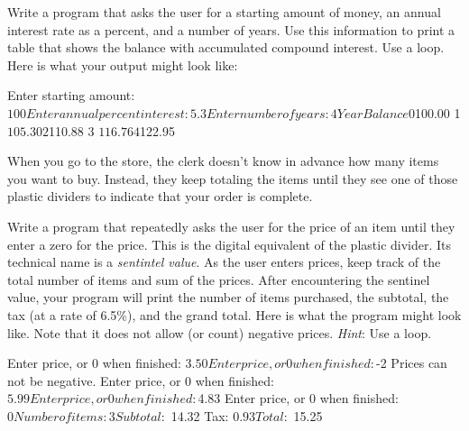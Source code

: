 \begin{exercise}
Write a program that asks the user for a starting amount of money, an annual interest rate as a percent, and a number of years. Use this information to print a table that shows the balance with accumulated compound interest. Use a  loop. Here is what your output might look like:

\begin{stdout}
Enter starting amount: $100
Enter annual percent interest: 5.3
Enter number of years: 4
Year  Balance
0     $100.00
1     $105.30
2     $110.88
3     $116.76
4     $122.95
\end{stdout}

\end{exercise}
\begin{exercise}
When you go to the store, the clerk doesn't know in advance how many items you want to buy. Instead, they keep totaling the items until they see one of those plastic dividers to indicate that your order is complete.

Write a program that repeatedly asks the user for the price of an item until they enter a zero for the price. This is the digital equivalent of the plastic divider. Its technical name is a {\em sentintel value}. As the user enters prices, keep track of the total number of items and sum of the prices.  After encountering the sentinel value, your program will print the number of items purchased, the subtotal, the tax (at a rate of 6.5\%), and the grand total. Here is what the program might look like. Note that it does not allow (or count) negative prices. {\em Hint}: Use a  loop.

\begin{stdout}
Enter price, or 0 when finished: $3.50    
Enter price, or 0 when finished: $-2
Prices can not be negative.
Enter price, or 0 when finished: $5.99
Enter price, or 0 when finished: $4.83
Enter price, or 0 when finished: $0

Number of items: 3
Subtotal:  $   14.32
Tax:       $    0.93
Total:     $   15.25
\end{stdout}
\end{exercise}


